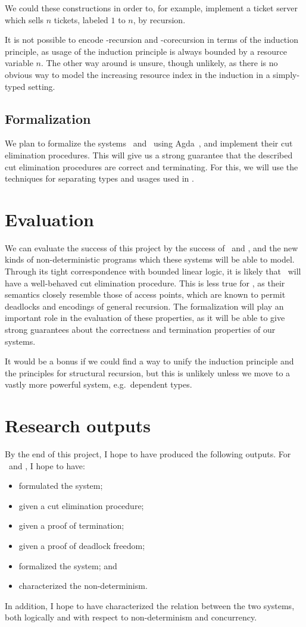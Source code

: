 \documentclass[10pt,a4paper,twocolumn,notitlepage]{article}
\begin{document}
We could these constructions in order to, for example, implement a ticket server
which sells $n$ tickets, labeled $1$ to $n$, by recursion.

It is not possible to encode  \textmu-recursion and \textnu-corecursion in terms
of the induction principle, as usage of the induction principle is always
bounded by a resource variable $n$.
The other way around is unsure, though unlikely, as there is no obvious way to
model the increasing resource index in the induction in a simply-typed setting.

\subsection{Formalization}
We plan to formalize the systems \gtcp\ and \ndcp\ using
Agda~\citep{norell2009}, and implement their cut elimination procedures. This
will give us a strong guarantee that the described cut elimination procedures
are correct and terminating. For this, we will use the techniques for separating
types and usages used in \citet{mcbride2016}. 

\section{Evaluation}
We can evaluate the success of this project by the success of \gtcp\ and \ndcp,
and the new kinds of non-deterministic programs which these systems will be able
to model.
Through its tight correspondence with bounded linear logic, it is likely 
that \gtcp\ will have a well-behaved cut elimination procedure.
This is less true for \ndcp, as their semantics closely resemble those of access
points, which are known to permit deadlocks and encodings of general recursion.
The formalization will play an important role in the evaluation of these
properties, as it will be able to give strong guarantees about the correctness
and termination properties of our systems.

It would be a bonus if we could find a way to unify the induction principle and
the principles for structural recursion, but this is unlikely unless we move to
a vastly more powerful system, e.g.\ dependent types.

\section{Research outputs}
By the end of this project, I hope to have produced the following outputs.
For \gtcp\ and \ndcp, I hope to have:
\begin{itemize}[noitemsep]
\item formulated the system;
\item given a cut elimination procedure;
\item given a proof of termination;
\item given a proof of deadlock freedom;
\item formalized the system; and
\item characterized the non-determinism.
\end{itemize}
In addition, I hope to have characterized the relation between the two systems,
both logically and with respect to non-determinism and concurrency.
\end{document}
